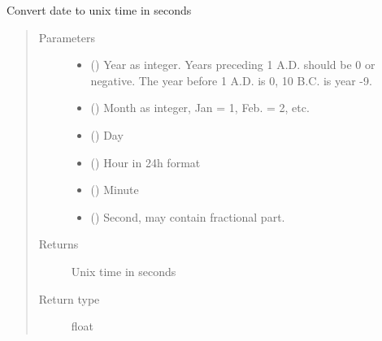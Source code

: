 \documentclass[letterpaper,10pt,english]{sphinxmanual}
\begin{document}
\begin{fulllineitems}
\label{\detokenize{modules/ccsds_write:ccsds_write.date2unix}}
Convert date to unix time in seconds
\begin{quote}\begin{description}
\item[{Parameters}] \leavevmode\begin{itemize}
\item {} 
 () \textendash{} Year as integer. Years preceding 1 A.D. should be 0 or negative. The year before 1 A.D. is 0, 10 B.C. is year -9.

\item {} 
 () \textendash{} Month as integer, Jan = 1, Feb. = 2, etc.

\item {} 
 () \textendash{} Day

\item {} 
 () \textendash{} Hour in 24h format

\item {} 
 () \textendash{} Minute

\item {} 
 () \textendash{} Second, may contain fractional part.

\end{itemize}

\item[{Returns}] \leavevmode
Unix time in seconds

\item[{Return type}] \leavevmode
float

\end{description}\end{quote}

\end{fulllineitems}
\end{document}

